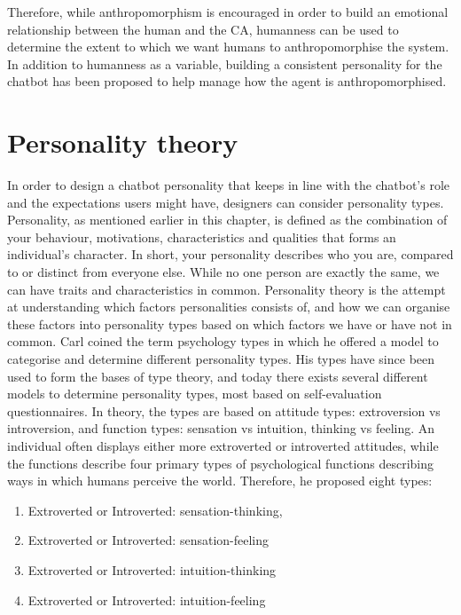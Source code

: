 Therefore, while anthropomorphism is encouraged in order to build an emotional relationship between the human and the CA, humanness can be used to determine the extent to which we want humans to anthropomorphise the system. In addition to humanness as a variable, building a consistent personality for the chatbot has been proposed to help manage how the agent is anthropomorphised.

\vspace{5mm} %

\section{Personality theory}
In order to design a chatbot personality that keeps in line with the chatbot's role and the expectations users might have, designers can consider personality types. Personality, as mentioned earlier in this chapter, is defined as the combination of your behaviour, motivations, characteristics and qualities that forms an individual's character. In short, your personality describes who you are, compared to or distinct from everyone else. While no one person are exactly the same, we can have traits and characteristics in common. Personality theory is the attempt at understanding which factors personalities consists of, and how we can organise these factors into personality types based on which factors we have or have not in common. Carl \cite{Jung1923} coined the term psychology types in which he offered a model to categorise and determine different personality types. His types have since been used to form the bases of type theory, and today there exists several different models to determine personality types, most based on self-evaluation questionnaires. In \cite{Jung1923} theory, the types are based on attitude types: extroversion vs introversion, and function types: sensation vs intuition, thinking vs feeling. An individual often displays either more extroverted or introverted attitudes, while the functions describe four primary types of psychological functions describing ways in which humans perceive the world. Therefore, he proposed eight types:

\begin{enumerate}
    \item Extroverted or Introverted: sensation-thinking, 
    \item Extroverted or Introverted: sensation-feeling
    \item Extroverted or Introverted: intuition-thinking
    \item Extroverted or Introverted: intuition-feeling
\end{enumerate}

